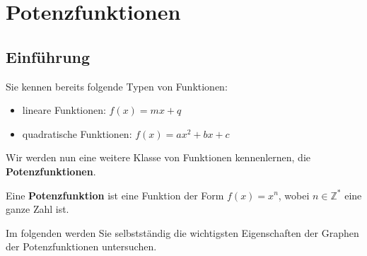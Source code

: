 \section{Potenzfunktionen}
\subsection{Einführung}
Sie kennen bereits folgende Typen von Funktionen:
\begin{itemize}
    \item lineare Funktionen: $f(x) = mx + q$
    \item quadratische Funktionen: $f(x)=ax^2+bx+c$
\end{itemize}
Wir werden nun eine weitere Klasse von Funktionen kennenlernen, die \textbf{Potenzfunktionen}.
\begin{deff}[Potenzfunktionen]{}
    Eine \textbf{Potenzfunktion} ist eine Funktion der Form $f(x) = x^n$, wobei $n\in \mathbb{Z}^*$ eine ganze Zahl ist.
\end{deff}
Im folgenden werden Sie selbstständig die wichtigsten Eigenschaften der Graphen der Potenzfunktionen untersuchen.
